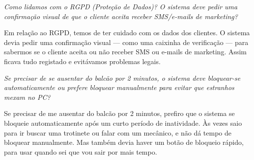 \documentclass[11pt,a4paper]{article}
\newcommand{\pergunta}[1]{\item[P:] \textit{#1}}
\newcommand{\resposta}[1]{\item[R:] #1}
\begin{document}
\begin{transcription}
		\pergunta{Como lidamos com o RGPD (Proteção de Dados)? O sistema deve pedir uma confirmação visual de que o cliente aceita receber SMS/e-mails de marketing?}
		\resposta{Em relação ao RGPD, temos de ter cuidado com os dados dos clientes. O sistema devia pedir uma confirmação visual — como uma caixinha de verificação — para sabermos se o cliente aceita ou não receber SMS ou e-mails de marketing. Assim ficava tudo registado e evitávamos problemas legais.}
		
		\pergunta{Se precisar de se ausentar do balcão por 2 minutos, o sistema deve bloquear-se automaticamente ou prefere bloquear manualmente para evitar que estranhos mexam no PC?}
		\resposta{Se precisar de me ausentar do balcão por 2 minutos, prefiro que o sistema se bloqueie automaticamente após um curto período de inatividade. Às vezes saio para ir buscar uma trotinete ou falar com um mecânico, e não dá tempo de bloquear manualmente. Mas também devia haver um botão de bloqueio rápido, para usar quando sei que vou sair por mais tempo.}
	
	\end{transcription}

%	
%	
	
\end{document}
